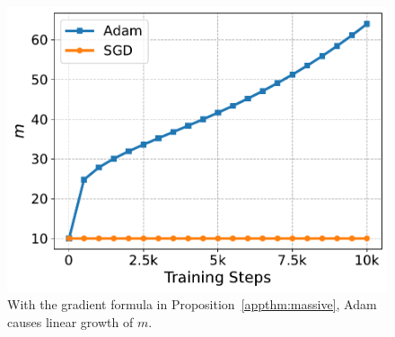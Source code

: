 \begin{figure}[h]
    \centering
    \includegraphics[width=0.5\linewidth]{Figures/BBM_appendix/m_dynamics.pdf}
    \caption{With the gradient formula in Proposition~\ref{appthm:massive}, Adam causes linear growth of $m$. 
    }
    \label{appfigure:m_dynamics}
\end{figure}